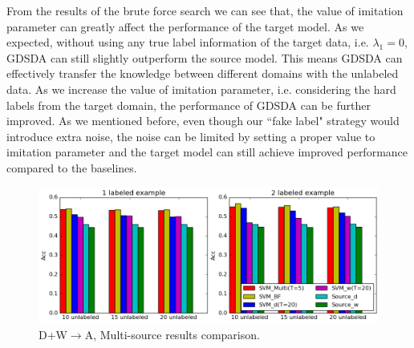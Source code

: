 From the results of the brute force search we can see that, the value of imitation parameter can greatly affect the performance of the target model.
As we expected, without using any true label information of the target data, i.e. $\lambda_1 = 0$, GDSDA can still slightly outperform the source model. This means GDSDA can effectively transfer the knowledge between different domains with the unlabeled data. As we increase the value of imitation parameter, i.e. considering the hard labels from the target domain, the performance of GDSDA can be further improved. As we mentioned before, even though our ``fake label" strategy would introduce extra noise, the noise can be limited by setting a proper value to imitation parameter and the target model can still achieve improved performance compared to the baselines.

\begin{figure}[h]
	\centering
	\includegraphics[scale=.50]{aaai/figure/cmp.png}
	\caption{D+W$\rightarrow$A, Multi-source results comparison.}\label{fig:multi}
\end{figure}
